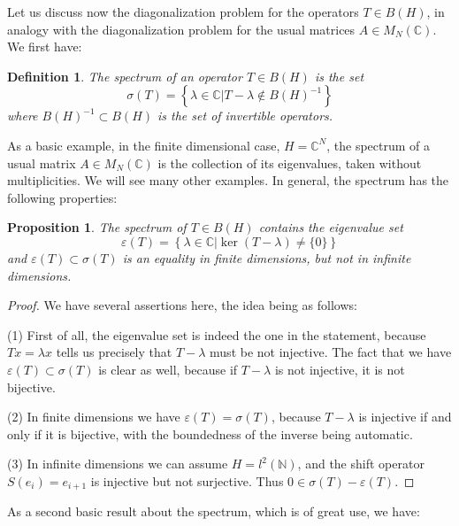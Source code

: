 \documentclass[12pt]{amsbook}
\newtheorem{definition}[theorem]{Definition}
\newtheorem{proposition}[theorem]{Proposition}
\begin{document}
Let us discuss now the diagonalization problem for the operators $T\in B(H)$, in analogy with the diagonalization problem for the usual matrices $A\in M_N(\mathbb C)$. We first have:

\begin{definition}
The spectrum of an operator $T\in B(H)$ is the set
$$\sigma(T)=\left\{\lambda\in\mathbb C\Big|T-\lambda\not\in B(H)^{-1}\right\}$$
where $B(H)^{-1}\subset B(H)$ is the set of invertible operators.
\end{definition}

As a basic example, in the finite dimensional case, $H=\mathbb C^N$, the spectrum of a usual matrix $A\in M_N(\mathbb C)$ is the collection of its eigenvalues, taken without multiplicities. We will see many other examples. In general, the spectrum has the following properties:


\begin{proposition}
The spectrum of $T\in B(H)$ contains the eigenvalue set
$$\varepsilon(T)=\left\{\lambda\in\mathbb C\Big|\ker(T-\lambda)\neq\{0\}\right\}$$
and $\varepsilon(T)\subset\sigma(T)$ is an equality in finite dimensions, but not in infinite dimensions.
\end{proposition}

\begin{proof}
We have several assertions here, the idea being as follows:

\medskip

(1) First of all, the eigenvalue set is indeed the one in the statement, because $Tx=\lambda x$ tells us precisely that $T-\lambda$ must be not injective. The fact that we have $\varepsilon(T)\subset\sigma(T)$ is clear as well, because if $T-\lambda$ is not injective, it is not bijective.

\medskip

(2) In finite dimensions we have $\varepsilon(T)=\sigma(T)$, because $T-\lambda$ is injective if and only if it is bijective, with the boundedness of the inverse being automatic. 

\medskip

(3) In infinite dimensions we can assume $H=l^2(\mathbb N)$, and the shift operator $S(e_i)=e_{i+1}$ is injective but not surjective. Thus $0\in\sigma(T)-\varepsilon(T)$.
\end{proof}

As a second basic result about the spectrum, which is of great use, we have:
\end{document}
